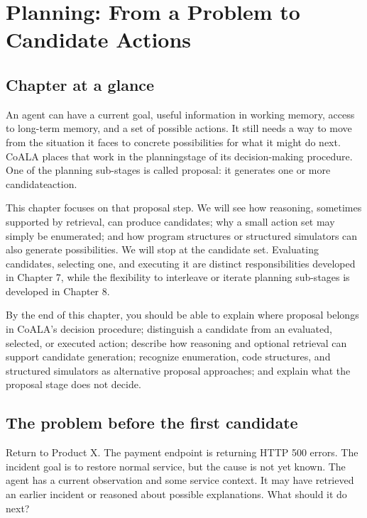 \chapter{Planning: From a Problem to Candidate Actions}
\label{ch:planning-proposal}

\section*{Chapter at a glance}
{}

An agent can have a current goal, useful information in working memory, access to long-term memory, and a set of possible actions. It still needs a way to move from the situation it faces to concrete possibilities for what it might do next. CoALA places that work in the \gls{planningstage} of its decision-making procedure. One of the planning sub-stages is called \gls{proposal}: it generates one or more \gls{candidateaction}.

This chapter focuses on that proposal step. We will see how reasoning, sometimes supported by retrieval, can produce candidates; why a small action set may simply be enumerated; and how program structures or structured simulators can also generate possibilities. We will stop at the candidate set. Evaluating candidates, selecting one, and executing it are distinct responsibilities developed in Chapter 7, while the flexibility to interleave or iterate planning sub-stages is developed in Chapter 8.

\begin{learningbox}
By the end of this chapter, you should be able to explain where proposal belongs in CoALA's decision procedure; distinguish a candidate from an evaluated, selected, or executed action; describe how reasoning and optional retrieval can support candidate generation; recognize enumeration, code structures, and structured simulators as alternative proposal approaches; and explain what the proposal stage does not decide.
\end{learningbox}

\section{The problem before the first candidate}
\label{sec:problem-before-candidate}

Return to Product X. The payment endpoint is returning HTTP 500 errors. The incident goal is to restore normal service, but the cause is not yet known. The agent has a current observation and some service context. It may have retrieved an earlier incident or reasoned about possible explanations. What should it do next?

